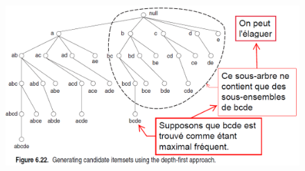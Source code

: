 \documentclass[letterpaper, 12pt]{article}
\begin{document}
				\begin{figure}[H]
					\centering
					\includegraphics[scale=0.6]{Images/lattice_4}
					\caption{}
					\label{fig:lattice:4}
				\end{figure}\noindent
\end{document}
